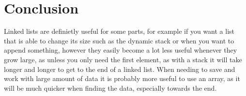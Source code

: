 \documentclass[a4paper,11pt]{article}
\begin{document}
\section*{Conclusion}
Linked lists are definietly useful for some parts, for example if you want a list that is able to change its size such as the dynamic stack or when you want to append something, however they easily 
become a lot less useful whenever they grow large, as unless you only need the first element, as with a stack it will take longer and longer to get to the end of a linked list. When needing to save and work with 
large amount of data it is probably more useful to use an array, as it will be much quicker when finding the data, especially towards the end.





\newpage
\end{document}
